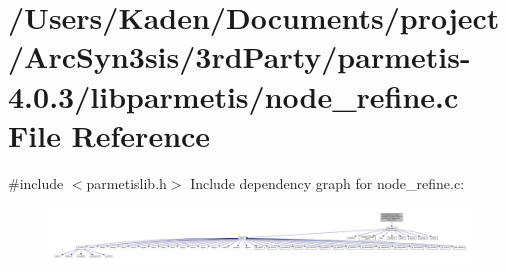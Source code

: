 \hypertarget{a00383}{}\section{/\+Users/\+Kaden/\+Documents/project/\+Arc\+Syn3sis/3rd\+Party/parmetis-\/4.0.3/libparmetis/node\+\_\+refine.c File Reference}
\label{a00383}
{\ttfamily \#include $<$parmetislib.\+h$>$}\newline
Include dependency graph for node\+\_\+refine.\+c\+:\nopagebreak
\begin{figure}[H]
\begin{center}
\leavevmode
\includegraphics[width=350pt]{a00384}
\end{center}
\end{figure}
